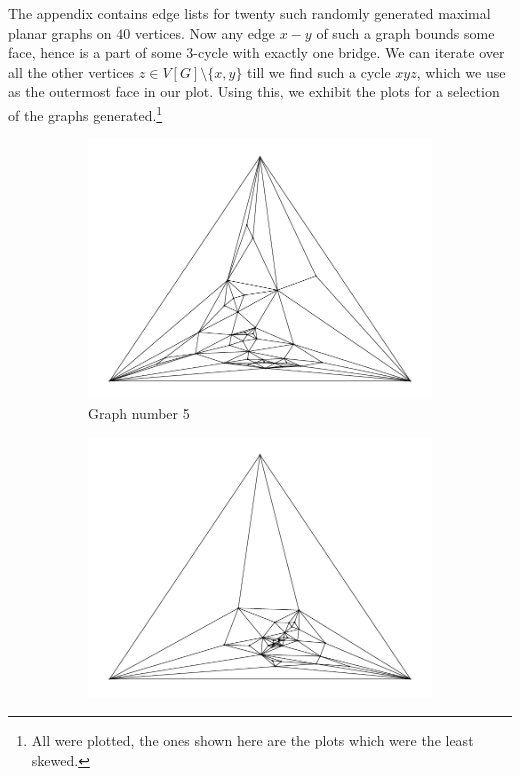 \documentclass[12pt]{article}
\begin{document}
The appendix contains edge lists for twenty such randomly generated maximal
planar graphs on \(40\) vertices. Now any edge \(x-y\) of such a graph bounds some face,
hence is a part of some \(3\)-cycle with exactly one bridge. We can iterate over
all the other vertices \(z\in V[G]\setminus \{x,y\}\) till we find such a cycle
\(xyz\), which we use as the outermost face in our plot. Using this, we exhibit
the plots for a selection of the graphs generated.\footnote{All were plotted,
the ones shown here are the plots which were the least skewed.}
  \begin{figure}[H]
      \centering 
      \begin{subfigure}[b]{0.45\textwidth}
          \centering 
          \includegraphics[width = \textwidth]{../output/Q9-random-405.pdf}
          \caption{Graph number 5}
      \end{subfigure}
      \hfill
      \begin{subfigure}[b]{0.45\textwidth}
          \centering 
          \includegraphics[width = \textwidth]{../output/Q9-random-409.pdf}

\end{subfigure}
\end{figure}
\end{document}
